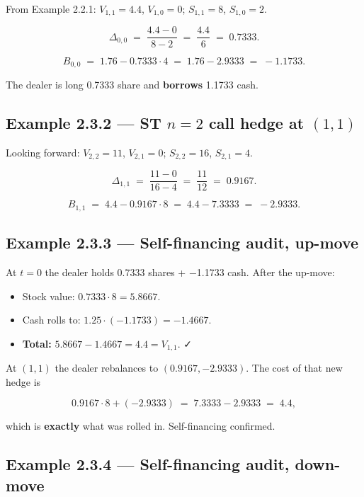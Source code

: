 \documentclass[
  10pt,
  twoside]{book}
\providecommand{\tightlist}{%
  \setlength{\itemsep}{0pt}\setlength{\parskip}{0pt}}
\begin{document}
From Example 2.2.1: \(V_{1,1}=4.4\), \(V_{1,0}=0\); \(S_{1,1}=8\),
\(S_{1,0}=2\).

\[
\Delta_{0,0} \;=\; \frac{4.4 - 0}{8 - 2} \;=\; \frac{4.4}{6} \;=\; 0.7333.
\]

\[
B_{0,0} \;=\; 1.76 - 0.7333\cdot 4 \;=\; 1.76 - 2.9333 \;=\; -1.1733.
\]

The dealer is long 0.7333 share and \textbf{borrows} 1.1733 cash.

\subsection{\texorpdfstring{Example 2.3.2 --- ST \(n=2\) call hedge at
\((1,1)\)}{Example 2.3.2 --- ST n=2 call hedge at (1,1)}}\label{example-2.3.2-st-n2-call-hedge-at-11}

Looking forward: \(V_{2,2}=11\), \(V_{2,1}=0\); \(S_{2,2}=16\),
\(S_{2,1}=4\).

\[
\Delta_{1,1} \;=\; \frac{11-0}{16-4} \;=\; \frac{11}{12} \;=\; 0.9167.
\]

\[
B_{1,1} \;=\; 4.4 - 0.9167\cdot 8 \;=\; 4.4 - 7.3333 \;=\; -2.9333.
\]

\subsection{Example 2.3.3 --- Self-financing audit,
up-move}\label{example-2.3.3-self-financing-audit-up-move}

At \(t=0\) the dealer holds 0.7333 shares + −1.1733 cash. After the
up-move:

\begin{itemize}
\tightlist
\item
  Stock value: \(0.7333\cdot 8 = 5.8667\).
\item
  Cash rolls to: \(1.25\cdot(-1.1733) = -1.4667\).
\item
  \textbf{Total:} \(5.8667 - 1.4667 = 4.4 = V_{1,1}\). ✓
\end{itemize}

At \((1,1)\) the dealer rebalances to \((0.9167, -2.9333)\). The cost of
that new hedge is

\[
0.9167\cdot 8 + (-2.9333) \;=\; 7.3333 - 2.9333 \;=\; 4.4,
\]

which is \textbf{exactly} what was rolled in. Self-financing confirmed.

\subsection{Example 2.3.4 --- Self-financing audit,
down-move}\label{example-2.3.4-self-financing-audit-down-move}
\end{document}
